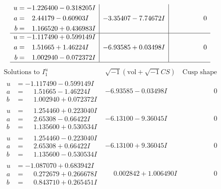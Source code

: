\documentclass[1p]{elsarticle_modified}
\theoremstyle{definition}
\newcommand{\I}{\sqrt{-1}}
\begin{document}
$$\begin{array}{c|c|c}
\begin{aligned}
u &= -1.226400 - 0.318205 I \\
a &= \phantom{-}2.44179 - 0.60903 I \\
b &= \phantom{-}1.166520 + 0.436983 I\end{aligned}
 & -3.35407 - 7.74672 I & \phantom{-0.000000 } 0 \\ \hline\begin{aligned}
u &= -1.117490 + 0.599149 I \\
a &= \phantom{-}1.51665 + 1.46224 I \\
b &= \phantom{-}1.002940 - 0.072372 I\end{aligned}
 & -6.93585 + 0.03498 I & \phantom{-0.000000 } 0\\
 \hline 
 \end{array}$$\newpage$$\begin{array}{c|c|c}  
\text{Solutions to }I^u_{1}& \I (\text{vol} + \sqrt{-1}CS) & \text{Cusp shape}\\
 \hline 
\begin{aligned}
u &= -1.117490 - 0.599149 I \\
a &= \phantom{-}1.51665 - 1.46224 I \\
b &= \phantom{-}1.002940 + 0.072372 I\end{aligned}
 & -6.93585 - 0.03498 I & \phantom{-0.000000 } 0 \\ \hline\begin{aligned}
u &= \phantom{-}1.254460 + 0.223040 I \\
a &= \phantom{-}2.65308 - 0.66422 I \\
b &= \phantom{-}1.135600 + 0.530534 I\end{aligned}
 & -6.13100 - 9.36045 I & \phantom{-0.000000 } 0 \\ \hline\begin{aligned}
u &= \phantom{-}1.254460 - 0.223040 I \\
a &= \phantom{-}2.65308 + 0.66422 I \\
b &= \phantom{-}1.135600 - 0.530534 I\end{aligned}
 & -6.13100 + 9.36045 I & \phantom{-0.000000 } 0 \\ \hline\begin{aligned}
u &= -1.087070 + 0.683942 I \\
a &= \phantom{-}0.272679 + 0.266678 I \\
b &= \phantom{-}0.843710 + 0.265451 I\end{aligned}
 & \phantom{-}0.002842 + 1.006490 I & \phantom{-0.000000 } 0 \\ \hline\begin{aligned}

\end{aligned}
\end{array}$$
\end{document}
